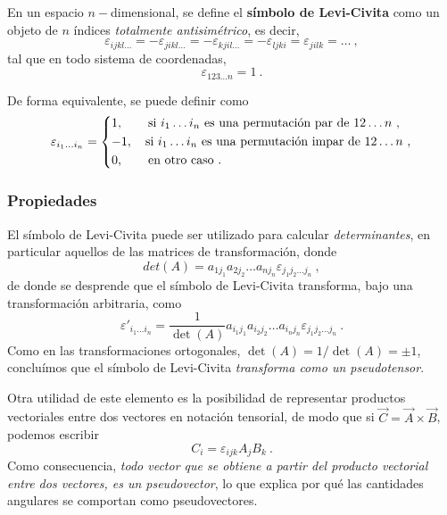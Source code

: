 \begin{defi}
    En un espacio $n-$dimensional, se define el \textbf{símbolo de Levi-Civita} como un objeto de $n$ índices \emph{totalmente antisimétrico}, es decir,
    \begin{equation}
        \varepsilon_{ijkl\dots} = -\varepsilon_{jikl\dots} = - \varepsilon_{kjil\dots} = - \varepsilon_{ljki} = \varepsilon_{jilk} = \dots \ ,
    \end{equation}
    tal que en todo sistema de coordenadas,
    \begin{equation}
        \varepsilon_{123 \dots n} = 1 \ .
    \end{equation}

    De forma equivalente, se puede definir como
    \begin{equation}
        \varepsilon_{i_1 \dots i_n} = \begin{dcases}
            1, \qquad \text{si } i_1 \dots i_n \text{ es una permutación par de } 12 \dots n \ , \\
            -1, \quad \text{si } i_1 \dots i_n \text{ es una permutación impar de } 12 \dots n \ , \\
            0, \qquad \text{en otro caso} \ .
        \end{dcases}
    \end{equation}
\end{defi}

\subsubsection*{Propiedades}

El símbolo de Levi-Civita puede ser utilizado para calcular \emph{determinantes}, en particular aquellos de las matrices de transformación, donde 
\begin{equation}
    det(A) = a_{1 j_1} a_{2 j_2} \dots a_{n j_n} \varepsilon_{j_1 j_2 \dots j_n} \ , 
\end{equation}
de donde se desprende que el símbolo de Levi-Civita transforma, bajo una transformación arbitraria, como
\begin{equation}
    \varepsilon'_{i_1 \dots i_n} = \frac{1}{\det(A)} a_{i_1 j_1} a_{i_2 j_2} \dots a_{i_n j_n} \varepsilon_{j_1 j_2 \dots j_n} \ .
\end{equation}
Como en las transformaciones ortogonales, $\det(A) = 1/\det(A) = \pm 1$, concluímos que el símbolo de Levi-Civita \emph{transforma como un pseudotensor}.

Otra utilidad de este elemento es la posibilidad de representar productos vectoriales entre dos vectores en notación tensorial, de modo que si $\vec{C} = \vec{A} \times \vec{B}$, podemos escribir
\begin{equation}
    C_i = \varepsilon_{ijk} A_j B_k \ .
\end{equation}
Como consecuencia, \emph{todo vector que se obtiene a partir del producto vectorial entre dos vectores, es un pseudovector}, lo que explica por qué las cantidades angulares se comportan como pseudovectores.

